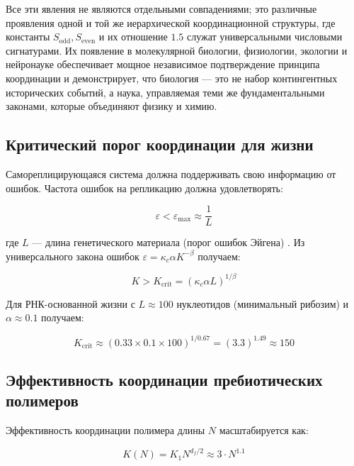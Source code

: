 \documentclass[12pt,a4paper]{article}
\theoremstyle{remark}
\newcommand{\kappac}{\kappa_c}
\newcommand{\eps}{\varepsilon}
\newcommand{\df}{d_{\!f}}
\begin{document}
	Все эти явления не являются отдельными совпадениями; это различные проявления одной и той же иерархической координационной структуры, где константы $S_{\mathrm{odd}}, S_{\mathrm{even}}$ и их отношение $1.5$ служат универсальными числовыми сигнатурами. Их появление в молекулярной биологии, физиологии, экологии и нейронауке обеспечивает мощное независимое подтверждение принципа координации и демонстрирует, что биология — это не набор контингентных исторических событий, а наука, управляемая теми же фундаментальными законами, которые объединяют физику и химию.
	
	\subsection{Критический порог координации для жизни}
	
	Самореплицирующаяся система должна поддерживать свою информацию от ошибок. Частота ошибок на репликацию должна удовлетворять:
	
	\begin{equation}
		\eps < \eps_{\text{max}} \approx \frac{1}{L}
		\label{eq:error-threshold}
	\end{equation}
	
	где $L$ — длина генетического материала (порог ошибок Эйгена) \cite{Eigen1971}. Из универсального закона ошибок $\eps = \kappac \alpha K^{-\beta}$ получаем:
	
	\begin{equation}
		K > K_{\text{crit}} = \left( \kappac \alpha L \right)^{1/\beta}
		\label{eq:Kcrit-life}
	\end{equation}
	
	Для РНК-основанной жизни с $L \approx 100$ нуклеотидов (минимальный рибозим) и $\alpha \approx 0.1$ получаем:
	
	\begin{equation}
		K_{\text{crit}} \approx (0.33 \times 0.1 \times 100)^{1/0.67} = (3.3)^{1.49} \approx 150
		\label{eq:Kcrit-life-num}
	\end{equation}
	
	\subsection{Эффективность координации пребиотических полимеров}
	
	Эффективность координации полимера длины $N$ масштабируется как:
	
	\begin{equation}
		K(N) = K_1 N^{\df/2} \approx 3 \cdot N^{1.1}
		\label{eq:K-polymer}
	\end{equation}
	
\end{document}
